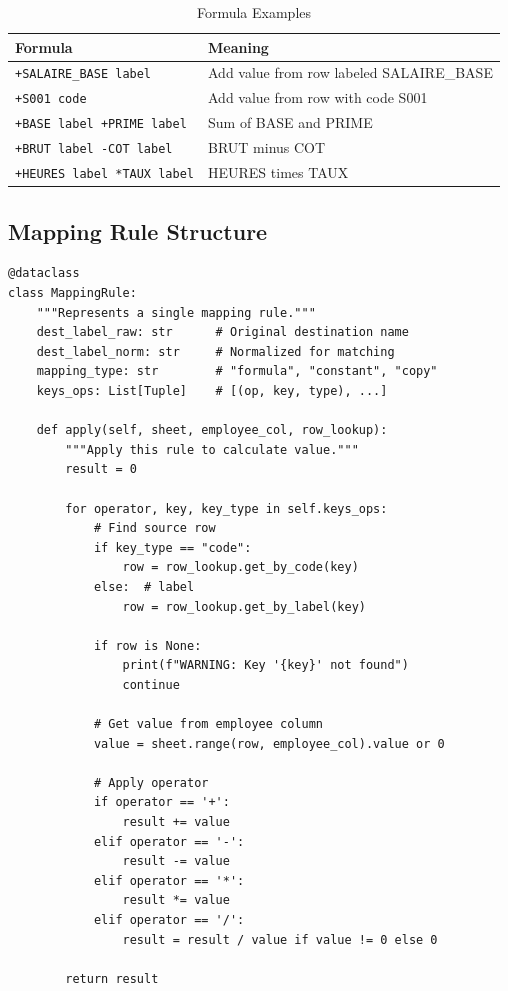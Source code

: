 \begin{table}[H]
\centering
\footnotesize
\begin{tabularx}{\textwidth}{lX}
\toprule
\textbf{Formula} & \textbf{Meaning} \\
\midrule
\texttt{+SALAIRE\_BASE label} & Add value from row labeled SALAIRE\_BASE \\
\texttt{+S001 code} & Add value from row with code S001 \\
\texttt{+BASE label +PRIME label} & Sum of BASE and PRIME \\
\texttt{+BRUT label -COT label} & BRUT minus COT \\
\texttt{+HEURES label *TAUX label} & HEURES times TAUX \\
\bottomrule
\end{tabularx}
\caption{Formula Examples}
\end{table}

\subsection{Mapping Rule Structure}

\begin{lstlisting}[style=pythonstyle]
@dataclass
class MappingRule:
    """Represents a single mapping rule."""
    dest_label_raw: str      # Original destination name
    dest_label_norm: str     # Normalized for matching
    mapping_type: str        # "formula", "constant", "copy"
    keys_ops: List[Tuple]    # [(op, key, type), ...]
    
    def apply(self, sheet, employee_col, row_lookup):
        """Apply this rule to calculate value."""
        result = 0
        
        for operator, key, key_type in self.keys_ops:
            # Find source row
            if key_type == "code":
                row = row_lookup.get_by_code(key)
            else:  # label
                row = row_lookup.get_by_label(key)
            
            if row is None:
                print(f"WARNING: Key '{key}' not found")
                continue
            
            # Get value from employee column
            value = sheet.range(row, employee_col).value or 0
            
            # Apply operator
            if operator == '+':
                result += value
            elif operator == '-':
                result -= value
            elif operator == '*':
                result *= value
            elif operator == '/':
                result = result / value if value != 0 else 0
        
        return result
\end{lstlisting}

